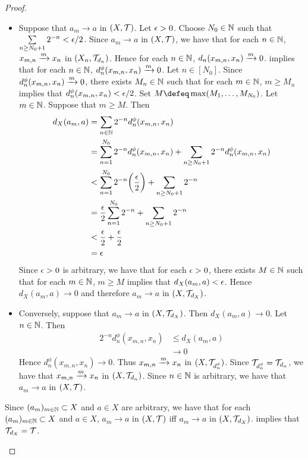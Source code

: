\documentclass{book}
\begin{document}
\begin{proof}
\begin{enumerate}
		\begin{itemize}
			\item Suppose that $a_m \rightarrow a$ in $(X, \mathcal{T})$. Let $\epsilon > 0$. Choose $N_0 \in \mathbb{N}$ such that $\sum\limits_{n \geq N_0 + 1} 2^{-n} < \epsilon/2$. Since $a_m \rightarrow a$ in $(X, \mathcal{T})$, we have that for each $n \in \mathbb{N}$, $x_{m, n} \xrightarrow{m} x_n$ in $(X_n, \mathcal{T}_{d_n})$. Hence for each $n \in \mathbb{N}$, $d_n(x_{m,n}, x_n) \xrightarrow{m} 0$.  implies that for each $n \in \mathbb{N}$, $d_n^{\phi}(x_{m,n}, x_n) \xrightarrow{m} 0$. Let $n \in [N_0]$. Since $d_n^{\phi}(x_{m,n}, x_n) \xrightarrow{m} 0$, there exists $M_n \in \mathbb{N}$ such that for each $m \in \mathbb{N}$, $m \geq M_n$ implies that $d_n^{\phi}(x_{m,n}, x_n) < \epsilon/2$. Set $M \defeq \max(M_1, \ldots, M_{N_0})$. Let $m \in \mathbb{N}$. Suppose that $m \geq M$. Then 
			\begin{align*}
				d_X(a_m, a)
				& = \sum_{n \in \mathbb{N}} 2^{-n} d_n^{\phi}(x_{m,n}, x_n) \\
				& = \sum_{n = 1}^{N_0} 2^{-n} d_n^{\phi}(x_{m,n}, x_n) + \sum_{n \geq N_0 + 1} 2^{-n} d_n^{\phi}(x_{m,n}, x_n) \\
				& < \sum_{n = 1}^{N_0} 2^{-n} \bigg( \frac{\epsilon}{2} \bigg) + \sum_{n \geq N_0 + 1} 2^{-n} \\
				& = \frac{\epsilon}{2} \sum_{n = 1}^{N_0} 2^{-n}  + \sum_{n \geq N_0 + 1} 2^{-n} \\
				& < \frac{\epsilon}{2} + \frac{\epsilon}{2} \\
				& = \epsilon 
			\end{align*}
			Since $\epsilon > 0$ is arbitrary, we have that for each $\epsilon > 0$, there exists $M \in \mathbb{N}$ such that for each $m \in \mathbb{N}$, $m \geq M$ implies that $d_X(a_m, a) < \epsilon$. Hence $d_X(a_m, a) \rightarrow 0$ and therefore $a_m \rightarrow a$ in $(X, \mathcal{T}_{d_X})$.  
			\item Conversely, suppose that $a_m \rightarrow a$ in $(X, \mathcal{T}_{d_X})$. Then $d_X(a_m, a) \rightarrow 0$. Let $n \in \mathbb{N}$. Then 
			\begin{align*}
				2^{-n} d_n^{\phi}(x_{m,n}, x_n)
				& \leq d_X(a_m, a) \\
				& \rightarrow 0
			\end{align*}
			Hence $d_n^{\phi}(x_{m,n}, x_n) \rightarrow 0$. Thus $x_{m,n} \xrightarrow{m} x_n$ in $(X, \mathcal{T}_{d_n^{\phi}})$. Since $\mathcal{T}_{d_n^{\phi}} = \mathcal{T}_{d_n}$, we have that $x_{m,n} \xrightarrow{m} x_n$ in $(X, \mathcal{T}_{d_n})$. Since $n \in \mathbb{N}$ is arbitrary, we have that $a_m \rightarrow a$ in $(X, \mathcal{T})$. 
		\end{itemize} 
		Since $(a_m)_{m \in \mathbb{N}} \subset X$ and $a \in X$ are arbitrary, we have that for each $(a_m)_{m \in \mathbb{N}} \subset X$ and $a \in X$, $a_m \rightarrow a$ in $(X, \mathcal{T})$ iff $a_m \rightarrow a$ in $(X, \mathcal{T}_{d_X})$.  implies that $\mathcal{T}_{d_X} = \mathcal{T}$.
	\end{enumerate}
\end{proof}
\end{document}
